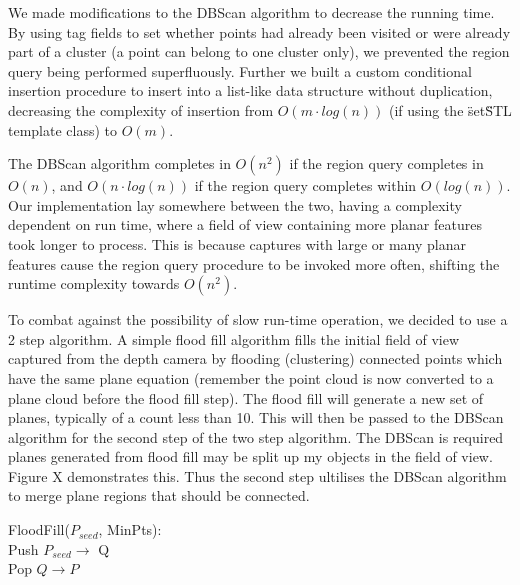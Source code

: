 \documentclass[]{article}
\begin{document}
{We made modifications to the DBScan algorithm to decrease the running time. By using tag fields to set whether points had already been visited or were already part of a cluster (a point can belong to one cluster only), we prevented the region query being performed superfluously. Further we built a custom conditional insertion procedure to insert into a list-like data structure without duplication, decreasing the complexity of insertion from $O(m \cdot log(n))$ (if using the \"set\" STL template class) to $O(m)$.

The DBScan algorithm completes in $O(n^2)$ if the region query completes in $O(n)$, and $O(n \cdot log(n))$ if the region query completes within $O(log(n))$. Our implementation lay somewhere between the two, having a complexity dependent on run time, where a field of view containing more planar features took longer to process. This is because captures with large or many planar features cause the region query procedure to be invoked more often, shifting the runtime complexity towards $O(n^2)$.

To combat against the possibility of slow run-time operation, we decided to use a 2 step algorithm. A simple flood fill algorithm fills the initial field of view captured from the depth camera by flooding  (clustering) connected points which have the same plane equation (remember the point cloud is now converted to a plane cloud before the flood fill step). The flood fill will generate a new set of planes, typically of a count less than 10. This will then be passed to the DBScan algorithm for the second step of the two step algorithm. The DBScan is required planes generated from flood fill may be split up my objects in the field of view. Figure X demonstrates this. Thus the second step ultilises the DBScan algorithm to merge plane regions that should be connected. 

\begin{algorithm}[tbp]
	\SetAlgoLined
	\bigskip
	FloodFill($P_{seed}$, MinPts): \\
	Push $P_{seed} \rightarrow$ Q \\
	{
	 	Pop $Q \rightarrow P$ \\
		}
\end{algorithm}}
\end{document}
